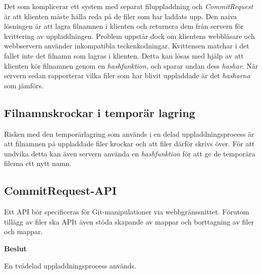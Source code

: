 Det som komplicerar ett system med separat filuppladdning och \emph{CommitRequest} är att klienten måste hålla reda på de filer som har laddats upp. Den naiva lösningen är att lagra filnamnen i klienten och returnera dem från servern för kvittering av uppladdningen. Problem uppstår dock om klientens webbläsare och webbservern använder inkompatibla teckenkodningar. Kvittensen matchar i det fallet inte det filnamn som lagras i klienten. 
Detta kan lösas med hjälp av att klienten kör filnamnen genom en \emph{hashfunktion}, och sparar undan dess \emph{hashar}. När servern sedan rapporterar vilka filer som har blivit uppladdade är det \emph{hasharna} som jämförs.

\subsection{Filnamnskrockar i temporär lagring}
Risken med den temporärlagring som används i en delad uppladdningsprocess är att filnamnen på uppladdade filer krockar och att filer därför skrivs över. För att undvika detta kan även servern använda en \emph{hashfunktion} för att ge de temporära filerna ett nytt namn.

\subsection{CommitRequest-API}
Ett API bör specificeras för Git-manipulationer via webbgränssnittet. Förutom tillägg av filer ska APIt även stöda skapande av mappar och borttagning av filer och mappar.

\begin{flushright}
  
  \textbf{Beslut}
  
  En tvådelad uppladdningsprocess används.
  
\end{flushright}
